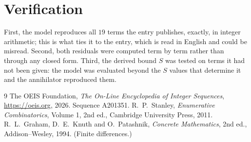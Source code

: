 \documentclass[11pt,a4paper]{article}
\theoremstyle{plain}
\theoremstyle{definition}
\begin{document}
\section{Verification}

First, the model reproduces all $19$ terms the entry publishes, exactly, in integer
arithmetic; this is what ties it to the entry, which is read in English and could be misread.
Second, both residuals were computed term by term rather than through any closed form. Third,
the derived bound $S$ was tested on terms it had not been given: the model was evaluated beyond
the $S$ values that determine it and the annihilator reproduced them.

\begin{thebibliography}{9}
 The OEIS Foundation, \emph{The On-Line Encyclopedia of Integer Sequences},
\url{https://oeis.org}, 2026. Sequence A201351.
 R.~P.~Stanley, \emph{Enumerative Combinatorics}, Volume 1, 2nd ed.,
Cambridge University Press, 2011.
 R.~L.~Graham, D.~E.~Knuth and O.~Patashnik, \emph{Concrete Mathematics},
2nd ed., Addison--Wesley, 1994. (Finite differences.)
\end{thebibliography}
\end{document}
